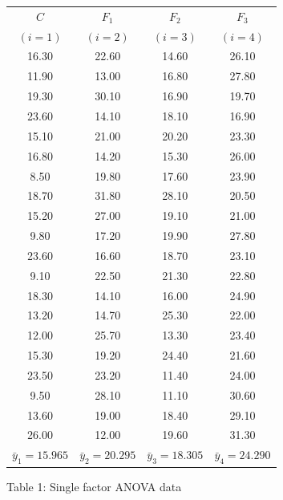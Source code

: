 \documentclass[letterpaper]{article}
\begin{document}
		\begin{center}
			\begin{tabular}{c c c c}
				\hline
				$C$ & $F_1$ & $F_2$ & $F_3$ \\
				$(i=1)$ & $(i=2)$ & $(i=3)$ & $(i=4)$ \\
				\hline
				16.30 & 22.60 & 14.60 & 26.10 \\
				11.90 & 13.00 & 16.80 & 27.80 \\
				19.30 & 30.10 & 16.90 & 19.70 \\
				23.60 & 14.10 & 18.10 & 16.90 \\
				15.10 & 21.00 & 20.20 & 23.30 \\
				16.80 & 14.20 & 15.30 & 26.00 \\
				8.50  & 19.80 & 17.60 & 23.90 \\
				18.70 & 31.80 & 28.10 & 20.50 \\
				15.20 & 27.00 & 19.10 & 21.00 \\
				9.80  & 17.20 & 19.90 & 27.80 \\
				23.60 & 16.60 & 18.70 & 23.10 \\
				9.10  & 22.50 & 21.30 & 22.80 \\
				18.30 & 14.10 & 16.00 & 24.90 \\
				13.20 & 14.70 & 25.30 & 22.00 \\
				12.00 & 25.70 & 13.30 & 23.40 \\
				15.30 & 19.20 & 24.40 & 21.60 \\
				23.50 & 23.20 & 11.40 & 24.00 \\
				9.50  & 28.10 & 11.10 & 30.60 \\
				13.60 & 19.00 & 18.40 & 29.10 \\
				26.00 & 12.00 & 19.60 & 31.30 \\
				\hline
				$\bar{y}_1=15.965$ & $\bar{y}_2=20.295$ & $\bar{y}_3=18.305$ & $\bar{y}_4=24.290$ \\
				\hline
			\end{tabular}
			
			Table 1: Single factor ANOVA data
		\end{center}
		
\end{document}
